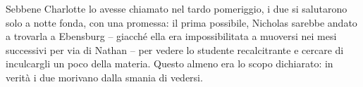 \documentclass[a4paper,oneside,11pt]{memoir}
\begin{document}
Sebbene Charlotte lo avesse chiamato nel tardo pomeriggio, i due si salutarono
solo a notte fonda, con una promessa: il prima possibile, Nicholas sarebbe
andato a trovarla a Ebensburg -- giacché ella era impossibilitata a muoversi nei
mesi successivi per via di Nathan -- per vedere lo studente recalcitrante e
cercare di inculcargli un poco della materia. Questo almeno era lo scopo
dichiarato: in verità i due morivano dalla smania di vedersi.

\end{document}
